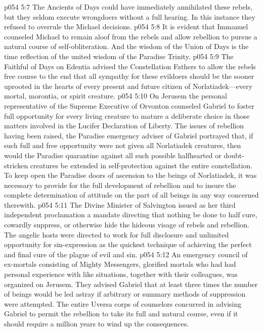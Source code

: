 \pc \vs p054 5:7 \bibnobreakspace The Ancients of Days could have immediately annihilated these rebels, but they seldom execute wrongdoers without a full hearing. In this instance they refused to overrule the Michael decisions.
\pc \vs p054 5:8 \bibnobreakspace It is evident that Immanuel counseled Michael to remain aloof from the rebels and allow rebellion to pursue a natural course of self\hyp{}obliteration. And the wisdom of the Union of Days is the time reflection of the united wisdom of the Paradise Trinity.
\pc \vs p054 5:9 \bibnobreakspace The Faithful of Days on Edentia advised the Constellation Fathers to allow the rebels free course to the end that all sympathy for these evildoers should be the sooner uprooted in the hearts of every present and future citizen of Norlatiadek---every mortal, morontia, or spirit creature.
\pc \vs p054 5:10 \bibnobreakspace On Jerusem the personal representative of the Supreme Executive of Orvonton counseled Gabriel to foster full opportunity for every living creature to mature a deliberate choice in those matters involved in the Lucifer Declaration of Liberty. The issues of rebellion having been raised, the Paradise emergency adviser of Gabriel portrayed that, if such full and free opportunity were not given all Norlatiadek creatures, then would the Paradise quarantine against all such possible halfhearted or doubt\hyp{}stricken creatures be extended in self\hyp{}protection against the entire constellation. To keep open the Paradise doors of ascension to the beings of Norlatiadek, it was necessary to provide for the full development of rebellion and to insure the complete determination of attitude on the part of all beings in any way concerned therewith.
\pc \vs p054 5:11 \bibnobreakspace The Divine Minister of Salvington issued as her third independent proclamation a mandate directing that nothing be done to half cure, cowardly suppress, or otherwise hide the hideous visage of rebels and rebellion. The angelic hosts were directed to work for full disclosure and unlimited opportunity for sin\hyp{}expression as the quickest technique of achieving the perfect and final cure of the plague of evil and sin.
\pc \vs p054 5:12 \bibnobreakspace An emergency council of ex\hyp{}mortals consisting of Mighty Messengers, glorified mortals who had had personal experience with like situations, together with their colleagues, was organized on Jerusem. They advised Gabriel that at least three times the number of beings would be led astray if arbitrary or summary methods of suppression were attempted. The entire Uversa corps of counselors concurred in advising Gabriel to permit the rebellion to take its full and natural course, even if it should require a million years to wind up the consequences.\plusone
